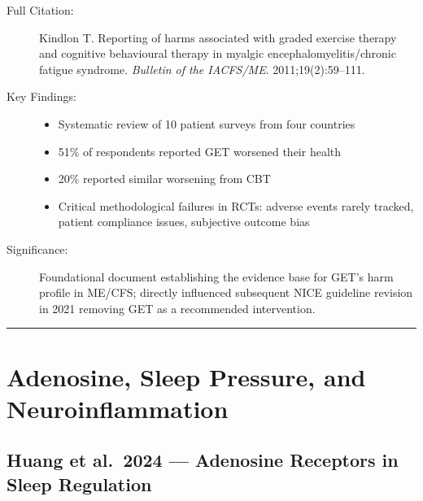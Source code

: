 \begin{description}
    \item[Full Citation:] Kindlon T\@. Reporting of harms associated with graded exercise therapy and cognitive behavioural therapy in myalgic encephalomyelitis/chronic fatigue syndrome. \textit{Bulletin of the IACFS/ME}. 2011;19(2):59--111.
    \item[Key Findings:]
    \begin{itemize}
        \item Systematic review of 10 patient surveys from four countries
        \item 51\% of respondents reported GET worsened their health
        \item 20\% reported similar worsening from CBT
        \item Critical methodological failures in RCTs: adverse events rarely tracked, patient compliance issues, subjective outcome bias
    \end{itemize}
    \item[Significance:] Foundational document establishing the evidence base for GET's harm profile in ME/CFS; directly influenced subsequent NICE guideline revision in 2021 removing GET as a recommended intervention.
\end{description}

\vspace{1cm}
\begin{center}
\rule{0.5\textwidth}{0.4pt}
\end{center}
\vspace{0.5cm}

\section{Adenosine, Sleep Pressure, and Neuroinflammation}
\label{sec:bib-adenosine-sleep}

\subsection{Huang et al.\ 2024 --- Adenosine Receptors in Sleep Regulation}

